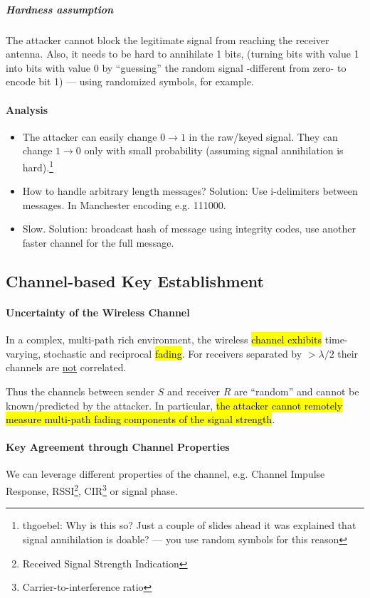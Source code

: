\subparagraph{Hardness assumption}
The attacker cannot block the legitimate signal from reaching the receiver antenna.
Also, it needs to be hard to annihilate 1 bits, (turning bits with value 1 into bits with value 0 by “guessing” the random signal -different from zero- to encode bit 1) --- using randomized symbols, for example.

\paragraph{Analysis}
\begin{itemize}
	\item The attacker can easily change $0 \rightarrow 1$ in the raw/keyed signal.
	      They can change $1 \rightarrow 0$ only with small probability (assuming signal annihilation is hard).\footnote{thgoebel: Why is this so? Just a couple of slides ahead it was explained that signal annihilation is doable? --- you use random symbols for this reason}
	\item How to handle arbitrary length messages?
	      Solution: Use i-delimiters between messages. In Manchester encoding e.g. 111000.
	\item Slow. Solution: broadcast hash of message using integrity codes, use another faster channel for the full message.
\end{itemize}



\subsection{Channel-based Key Establishment}

\paragraph{Uncertainty of the Wireless Channel}
In a complex, multi-path rich environment, the wireless \hl{channel exhibits} time-varying, stochastic and reciprocal \hl{fading}.
For receivers separated by $> \lambda / 2$ their channels are \underline{not} correlated.

Thus the channels between sender $S$ and receiver $R$ are ``random'' and cannot be known/predicted by the attacker.
In particular, \hl{the attacker cannot remotely measure multi-path fading components of the signal strength}.

\paragraph{Key Agreement through Channel Properties}
We can leverage different properties of the channel, e.g. Channel Impulse Response, RSSI\footnote{Received Signal Strength Indication}, CIR\footnote{Carrier-to-interference ratio} or signal phase.

